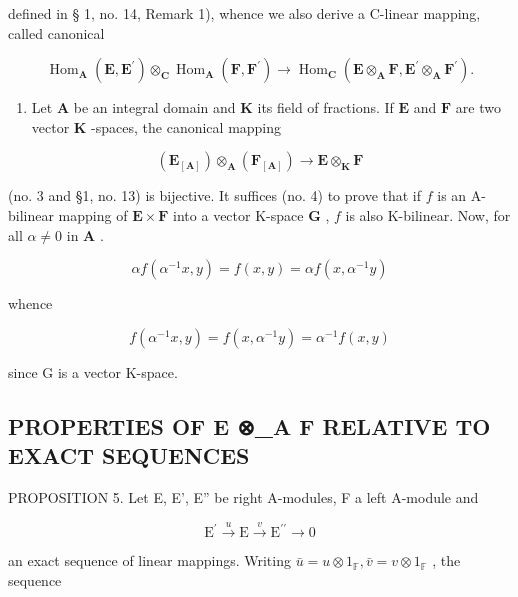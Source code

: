defined in § 1, no. 14, Remark 1), whence we also derive a C-linear mapping, called canonical

\[
\operatorname{Hom} _ {\mathbf {A}} (\mathbf {E}, \mathbf {E} ^ {\prime}) \otimes_ {\mathbf {C}} \operatorname{Hom} _ {\mathbf {A}} (\mathbf {F}, \mathbf {F} ^ {\prime}) \rightarrow \operatorname{Hom} _ {\mathbf {C}} (\mathbf {E} \otimes_ {\mathbf {A}} \mathbf {F}, \mathbf {E} ^ {\prime} \otimes_ {\mathbf {A}} \mathbf {F} ^ {\prime}).\tag{13}
\]

\begin{enumerate}
\def\labelenumi{(\arabic{enumi})}
\setcounter{enumi}{2}
\tightlist
\item
  Let \(\mathbf{A}\) be an integral domain and \(\mathbf{K}\) its field of fractions. If \(\mathbf{E}\) and \(\mathbf{F}\) are two vector \(\mathbf{K}\) -spaces, the canonical mapping
\end{enumerate}

\[
\left(\mathbf {E} _ {[ \mathbf {A} ]}\right) \otimes_ {\mathbf {A}} \left(\mathbf {F} _ {[ \mathbf {A} ]}\right)\rightarrow \mathbf {E} \otimes_ {\mathbf {K}} \mathbf {F}
\]

(no. 3 and §1, no. 13) is bijective. It suffices (no. 4) to prove that if \(f\) is an A-bilinear mapping of \(\mathbf{E} \times \mathbf{F}\) into a vector K-space \(\mathbf{G}\) , \(f\) is also K-bilinear. Now, for all \(\alpha \neq 0\) in \(\mathbf{A}\) .

\[
\alpha f (\alpha^ {- 1} x, y) = f (x, y) = \alpha f (x, \alpha^ {- 1} y)
\]

whence

\[
f (\alpha^ {- 1} x, y) = f (x, \alpha^ {- 1} y) = \alpha^ {- 1} f (x, y)
\]

since G is a vector K-space.

\subsection{PROPERTIES OF E ⊗\_A F RELATIVE TO EXACT SEQUENCES}

PROPOSITION 5. Let E, E', E'' be right A-modules, F a left A-module and

\[
\mathrm{E} ^ {\prime} \stackrel {u} {\longrightarrow} \mathrm{E} \stackrel {v} {\longrightarrow} \mathrm{E} ^ {\prime \prime} \longrightarrow 0\tag{14}
\]

an exact sequence of linear mappings. Writing \(\bar{u} = u \otimes 1_{\mathbb{F}}, \bar{v} = v \otimes 1_{\mathbb{F}}\) , the sequence

